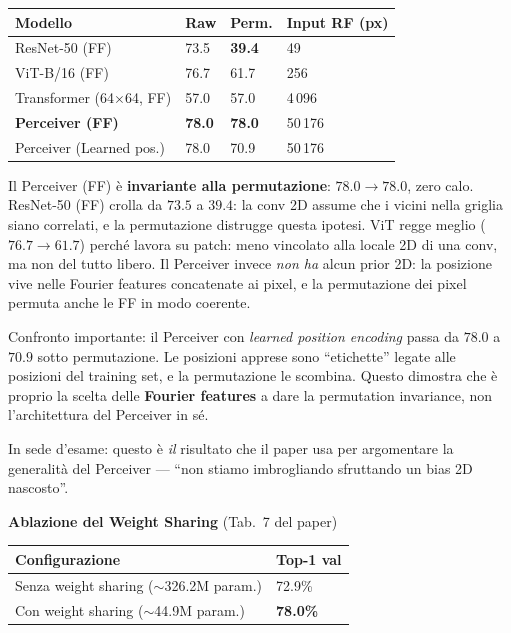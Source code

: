 \documentclass[
  11pt,
]{article}
\begin{document}
{\small
\begin{longtable}{@{}p{5cm} p{1.8cm} p{1.8cm} p{3cm}@{}}
\toprule
\textbf{Modello} & \textbf{Raw} & \textbf{Perm.} & \textbf{Input RF (px)} \\
\midrule
\endhead
ResNet-50 (FF) & 73.5 & \textbf{39.4} & 49 \\[2pt]
ViT-B/16 (FF) & 76.7 & 61.7 & 256 \\[2pt]
Transformer (64$\times$64, FF) & 57.0 & 57.0 & 4\,096 \\[2pt]
\textbf{Perceiver (FF)} & \textbf{78.0} & \textbf{78.0} & 50\,176 \\[2pt]
Perceiver (Learned pos.) & 78.0 & 70.9 & 50\,176 \\
\bottomrule
\end{longtable}
}

\begin{notabox}[title={\textbf{Argomento chiave del paper: permutation invariance}}]
Il Perceiver (FF) è \textbf{invariante alla permutazione}: $78.0 \to 78.0$, zero calo. ResNet-50 (FF) crolla da $73.5$ a $39.4$: la conv 2D assume che i vicini nella griglia siano correlati, e la permutazione distrugge questa ipotesi. ViT regge meglio ($76.7 \to 61.7$) perché lavora su patch: meno vincolato alla locale 2D di una conv, ma non del tutto libero. Il Perceiver invece \emph{non ha} alcun prior 2D: la posizione vive nelle Fourier features concatenate ai pixel, e la permutazione dei pixel permuta anche le FF in modo coerente.

Confronto importante: il Perceiver con \emph{learned position encoding} passa da $78.0$ a $70.9$ sotto permutazione. Le posizioni apprese sono ``etichette'' legate alle posizioni del training set, e la permutazione le scombina. Questo dimostra che è proprio la scelta delle \textbf{Fourier features} a dare la permutation invariance, non l'architettura del Perceiver in sé.

In sede d'esame: questo è \emph{il} risultato che il paper usa per argomentare la generalità del Perceiver --- ``non stiamo imbrogliando sfruttando un bias 2D nascosto''.
\end{notabox}

\textbf{Ablazione del Weight Sharing} (Tab.\ 7 del paper)

{\small
\begin{longtable}{@{}p{7cm} p{2.5cm}@{}}
\toprule
\textbf{Configurazione} & \textbf{Top-1 val} \\
\midrule
\endhead
Senza weight sharing ($\sim$326.2M param.) & 72.9\% \\[2pt]
Con weight sharing ($\sim$44.9M param.) & \textbf{78.0\%} \\
\bottomrule
\end{longtable}
}
\end{document}
